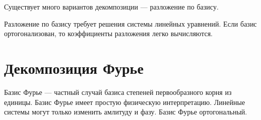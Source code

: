 Существует много вариантов декомпозиции --- разложение по базису.

Разложение по базису требует решения системы линейных уравнений.
Если базис ортогонализован, то коэффициенты разложения легко вычисляются.


\section{Декомпозиция Фурье}

Базис Фурье --- частный случай базиса степеней первообразного корня из единицы.
Базис Фурье имеет простую физическую интерпретацию.
Линейные системы могут только изменить амлитуду и фазу.
Базис Фурье ортогональный.